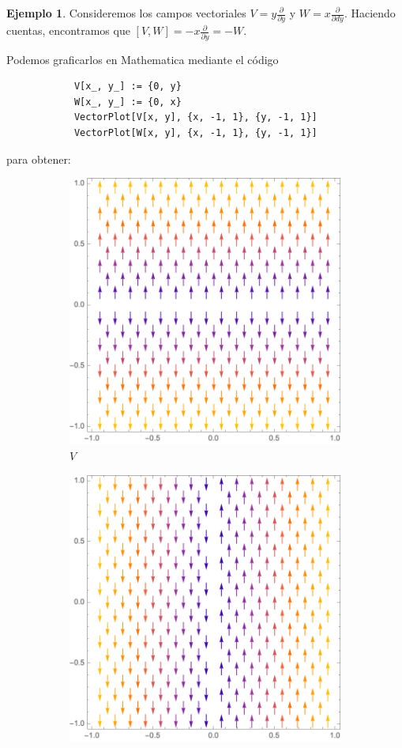 \documentclass[spanish]{book}
\theoremstyle{definition}
\newtheorem*{ejem}{Ejemplo}
\begin{document}
	\begin{ejem}
		Consideremos los campos vectoriales $V=y\frac{\partial}{\partial y}$ y $W=x\frac{\partial}{\partial dy}$. Haciendo cuentas, encontramos que  $[V,W]=-x\frac{\partial }{\partial y}=-W$.
		
		Podemos graficarlos en Mathematica mediante el código
		\begin{verbatim}
			V[x_, y_] := {0, y}
			W[x_, y_] := {0, x}
			VectorPlot[V[x, y], {x, -1, 1}, {y, -1, 1}]
			VectorPlot[W[x, y], {x, -1, 1}, {y, -1, 1}]
		\end{verbatim}
		para obtener:
		\begin{figure}[H]
			\begin{subfigure}{0.5\linewidth}
				\centering
				\includegraphics[width=0.9\linewidth]{fig6}
				\caption*{$V$}
			\end{subfigure}
			\begin{subfigure}{0.5\linewidth}
				\centering
				\includegraphics[width=0.9\linewidth]{fig7}

\end{subfigure}
\end{figure}
\end{ejem}
\end{document}
